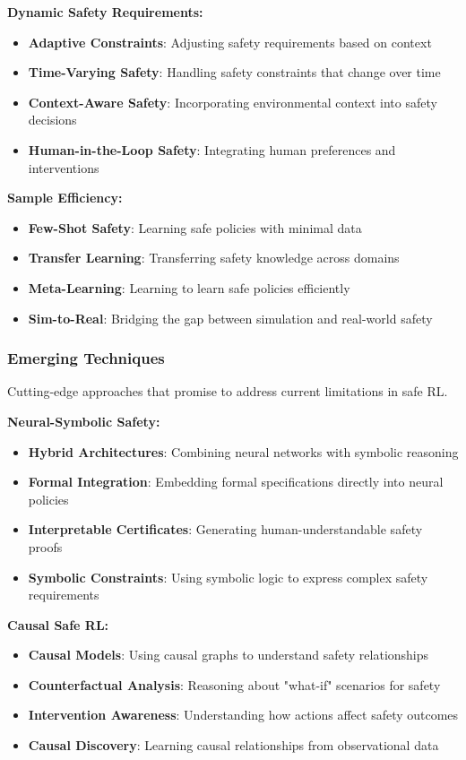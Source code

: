 \documentclass[12pt]{article}
\begin{document}
{{{{\textbf{Dynamic Safety Requirements:}
\begin{itemize}
\item \textbf{Adaptive Constraints}: Adjusting safety requirements based on context
\item \textbf{Time-Varying Safety}: Handling safety constraints that change over time
\item \textbf{Context-Aware Safety}: Incorporating environmental context into safety decisions
\item \textbf{Human-in-the-Loop Safety}: Integrating human preferences and interventions
\end{itemize}

\textbf{Sample Efficiency:}
\begin{itemize}
\item \textbf{Few-Shot Safety}: Learning safe policies with minimal data
\item \textbf{Transfer Learning}: Transferring safety knowledge across domains
\item \textbf{Meta-Learning}: Learning to learn safe policies efficiently
\item \textbf{Sim-to-Real}: Bridging the gap between simulation and real-world safety
\end{itemize}

\subsubsection{Emerging Techniques}

Cutting-edge approaches that promise to address current limitations in safe RL.

\textbf{Neural-Symbolic Safety:}
\begin{itemize}
\item \textbf{Hybrid Architectures}: Combining neural networks with symbolic reasoning
\item \textbf{Formal Integration}: Embedding formal specifications directly into neural policies
\item \textbf{Interpretable Certificates}: Generating human-understandable safety proofs
\item \textbf{Symbolic Constraints}: Using symbolic logic to express complex safety requirements
\end{itemize}

\textbf{Causal Safe RL:}
\begin{itemize}
\item \textbf{Causal Models}: Using causal graphs to understand safety relationships
\item \textbf{Counterfactual Analysis}: Reasoning about "what-if" scenarios for safety
\item \textbf{Intervention Awareness}: Understanding how actions affect safety outcomes
\item \textbf{Causal Discovery}: Learning causal relationships from observational data
\end{itemize}

}}}}
\end{document}
